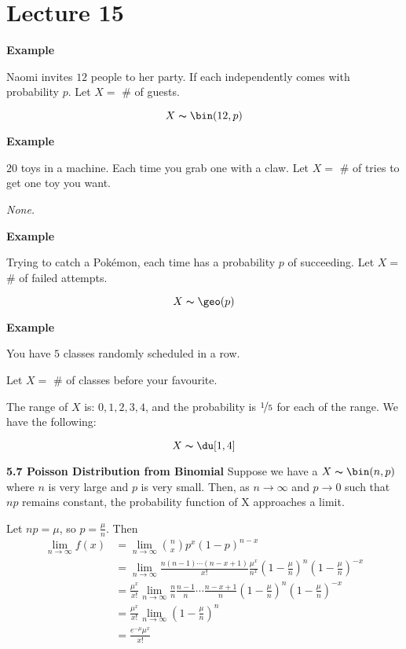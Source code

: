 \section{Lecture 15}
\textbf{Example}

Naomi invites $ 12 $ people to her party. If each independently comes with
probability $ p $.
Let $ X= $ \# of guests.

\[ X \thicksim \bin(12,p) \]

\textbf{Example}

$ 20 $ toys in a machine. Each time you grab one with a claw. 
Let $ X= $ \# of tries to get one toy you want.

\emph{None.}

\textbf{Example}

Trying to catch a Pokémon, each time has a probability $ p $ of succeeding.
Let $ X= $ \# of failed attempts.

\[ X \thicksim \geo(p) \]

\textbf{Example}

You have $ 5 $ classes randomly scheduled in a row.

Let $ X= $ \# of classes before your favourite.

The range of $ X $ is: $ 0,1,2,3,4 $, and the probability is
$ \nicefrac{1}{5} $ for each of the range. We have the following:

\[ X \thicksim \du[1,4] \]

\textbf{5.7 Poisson Distribution from Binomial}
Suppose we have a $ X \thicksim \bin(n,p) $ where $ n $ is very large
and $ p $ is very small. Then, as $ n\rightarrow \infty $ and $ p\rightarrow 0 $
such that $ np $ remains constant, the probability function of X
approaches a limit.

Let $ np=\mu $, so $ p=\frac{\mu}{n} $. Then
\begin{align*}
    \lim\limits_{{n} \to {\infty}} f\left(x\right)
    &=\lim\limits_{{n} \to {\infty}} \binom{n}{x}p^x\left(1-p\right)^{n-x}\\
    &=\lim\limits_{{n} \to {\infty}} \frac{n\left(n-1\right)\cdots\left(n-x+1\right)}{x!}
    \frac{\mu^x}{n^x} \left(1-\frac{\mu}{n}\right)^n\left(1-\frac{\mu}{n}\right)^{-x}\\
    &=\frac{\mu^x}{x!} \lim\limits_{{n} \to {\infty}} \frac{n}{n}
    \frac{n-1}{n} \cdots \frac{n-x+1}{n}\left(1-\frac{\mu}{n}\right)^n\left(1-\frac{\mu}{n}\right)^{-x}\\
    &=\frac{\mu^x}{x!} \lim\limits_{{n} \to {\infty}} \left(1-\frac{\mu}{n}\right)^n\\
    &=\frac{e^{-\mu}\mu^x}{x!}\\
\end{align*}

